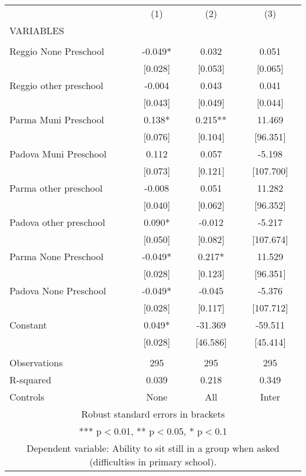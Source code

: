 \begin{tabular}{lccc} \hline
 & (1) & (2) & (3) \\
VARIABLES &  &  &  \\ \hline
 &  &  &  \\
Reggio None Preschool & -0.049* & 0.032 & 0.051 \\
 & [0.028] & [0.053] & [0.065] \\
Reggio other preschool & -0.004 & 0.043 & 0.041 \\
 & [0.043] & [0.049] & [0.044] \\
Parma Muni Preschool & 0.138* & 0.215** & 11.469 \\
 & [0.076] & [0.104] & [96.351] \\
Padova Muni Preschool & 0.112 & 0.057 & -5.198 \\
 & [0.073] & [0.121] & [107.700] \\
Parma other preschool & -0.008 & 0.051 & 11.282 \\
 & [0.040] & [0.062] & [96.352] \\
Padova other preschool & 0.090* & -0.012 & -5.217 \\
 & [0.050] & [0.082] & [107.674] \\
Parma None Preschool & -0.049* & 0.217* & 11.529 \\
 & [0.028] & [0.123] & [96.351] \\
Padova None Preschool & -0.049* & -0.045 & -5.376 \\
 & [0.028] & [0.117] & [107.712] \\
Constant & 0.049* & -31.369 & -59.511 \\
 & [0.028] & [46.586] & [45.414] \\
 &  &  &  \\
Observations & 295 & 295 & 295 \\
R-squared & 0.039 & 0.218 & 0.349 \\
 Controls & None & All & Inter \\ \hline
\multicolumn{4}{c}{ Robust standard errors in brackets} \\
\multicolumn{4}{c}{ *** p$<$0.01, ** p$<$0.05, * p$<$0.1} \\
\multicolumn{4}{c}{ Dependent variable: Ability to sit still in a group when asked (difficulties in primary school).} \\
\end{tabular}
